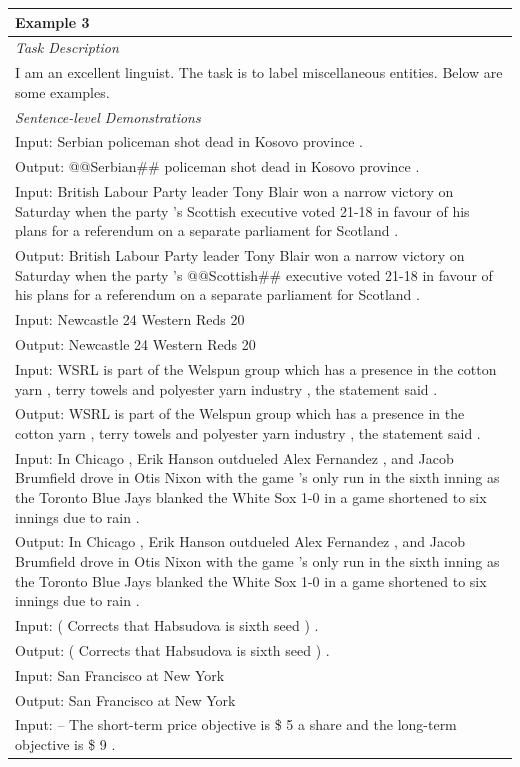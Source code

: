 \documentclass{article}
\begin{document}
\begin{table}[th!]
{\begin{tabular}{l}
\textbf{Example 3} \\\midrule
       	\textit{Task Description} \\
I am an excellent linguist. The task is to label miscellaneous entities. Below are some examples. \\\midrule
\textit{Sentence-level Demonstrations} \\
Input: Serbian policeman shot dead in Kosovo province . \\
Output: @@Serbian\#\# policeman shot dead in Kosovo province . \\
Input: British Labour Party leader Tony Blair won a narrow victory on Saturday when the party 's Scottish executive voted 21-18 in favour of his plans for a referendum on a separate parliament for Scotland . \\
Output: British Labour Party leader Tony Blair won a narrow victory on Saturday when the party 's @@Scottish\#\# executive voted 21-18 in favour of his plans for a referendum on a separate parliament for Scotland . \\
Input: Newcastle 24 Western Reds 20 \\
Output: Newcastle 24 Western Reds 20 \\
Input: WSRL is part of the Welspun group which has a presence in the cotton yarn , terry towels and polyester yarn industry , the statement said . \\
Output: WSRL is part of the Welspun group which has a presence in the cotton yarn , terry towels and polyester yarn industry , the statement said . \\
Input: In Chicago , Erik Hanson outdueled Alex Fernandez , and Jacob Brumfield drove in Otis Nixon with the game 's only run in the sixth inning as the Toronto Blue Jays blanked the White Sox 1-0 in a game shortened to six innings due to rain . \\
Output: In Chicago , Erik Hanson outdueled Alex Fernandez , and Jacob Brumfield drove in Otis Nixon with the game 's only run in the sixth inning as the Toronto Blue Jays blanked the White Sox 1-0 in a game shortened to six innings due to rain . \\
Input: ( Corrects that Habsudova is sixth seed ) . \\
Output: ( Corrects that Habsudova is sixth seed ) . \\
Input: San Francisco at New York \\
Output: San Francisco at New York \\
Input: -- The short-term price objective is \$ 5 a share and the long-term objective is \$ 9 . \\

\end{tabular}}
\end{table}
\end{document}
